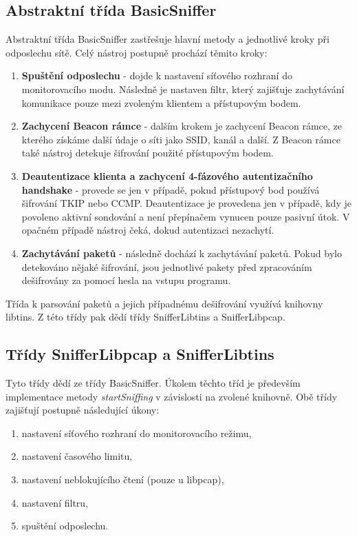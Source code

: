 \subsection{Abstraktní třída BasicSniffer}
Abstraktní třída BasicSniffer zastřešuje hlavní metody a jednotlivé kroky při odposlechu sítě. Celý nástroj postupně prochází těmito kroky: 
\begin{enumerate}
  \item{\textbf{Spuštění odposlechu} - dojde k nastavení síťového rozhraní do monitorovacího modu. Následně je nastaven filtr, který zajišťuje zachytávání komunikace pouze mezi zvoleným klientem a přístupovým bodem.}
  \item{\textbf{Zachycení Beacon rámce} - dalším krokem je zachycení Beacon rámce, ze kterého získáme další údaje o síti jako SSID, kanál a další. Z Beacon rámce také nástroj detekuje šifrování použité přístupovým bodem.}
  \item{\textbf{Deautentizace klienta a zachycení 4-fázového autentizačního handshake} - provede se jen v případě, pokud přístupový bod používá šifrování TKIP nebo CCMP. Deautentizace je provedena jen v případě, kdy je povoleno aktivní sondování a není přepínačem vynucen pouze pasivní útok. V opačném případě nástroj čeká, dokud autentizaci nezachytí.}
  \item{\textbf{Zachytávání paketů} - následně dochází k zachytávání paketů. Pokud bylo detekováno nějaké šifrování, jsou jednotlivé pakety před zpracováním dešifrovány za pomocí hesla na vstupu programu.}
\end{enumerate}

Třída k parsování paketů a jejich případnému dešifrování využívá knihovny libtins. Z této třídy pak dědí třídy SnifferLibtins a SnifferLibpcap.

\subsection{Třídy SnifferLibpcap a SnifferLibtins}
Tyto třídy dědí ze třídy BasicSniffer. Úkolem těchto tříd je především implementace metody \textit{startSniffing} v závislosti na zvolené knihovně. Obě třídy zajišťují postupně následující úkony:
\begin{enumerate}
  \item{nastavení síťového rozhraní do monitorovacího režimu,}
  \item{nastavení časového limitu,}
  \item{nastavení neblokujícího čtení (pouze u libpcap),}
  \item{nastavení filtru,}
  \item{spuštění odposlechu.}
\end{enumerate}

